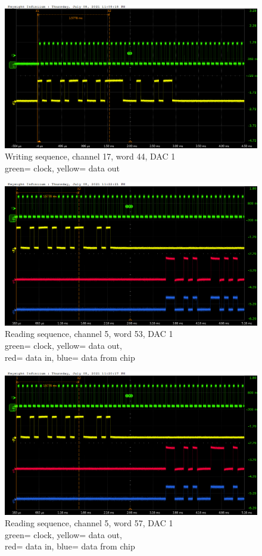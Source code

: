 \begin{figure}[H]
	\centering
	\includegraphics[width=0.6\linewidth]{IMG/ch5/probe/09-08-2021_ch17-write44-baselinedac1}
	\caption{Writing sequence, channel 17, word 44, DAC 1\\{\color{green}green}= clock, {\color{yellow}yellow}= data out}
	\label{fig:ch17write44}
\end{figure}

\begin{figure}[H]
	\centering
	\includegraphics[width=0.6\linewidth]{IMG/ch5/probe/09-08-2021_ch05-read53-baselinedac1}
	\caption{Reading sequence, channel 5, word 53, DAC 1\\{\color{green}green}= clock, {\color{yellow}yellow}= data out,\\{\color{red}red}= data in, {\color{blue}blue}= data from chip}
	\label{fig:ch05write53}
\end{figure}

\begin{figure}[H]
	\centering
	\includegraphics[width=0.6\linewidth]{IMG/ch5/probe/09-08-2021_ch05-read57-baselinedac1}
	\caption{Reading sequence, channel 5, word 57, DAC 1\\{\color{green}green}= clock, {\color{yellow}yellow}= data out,\\{\color{red}red}= data in, {\color{blue}blue}= data from chip}
	\label{fig:ch05write57}
\end{figure}

